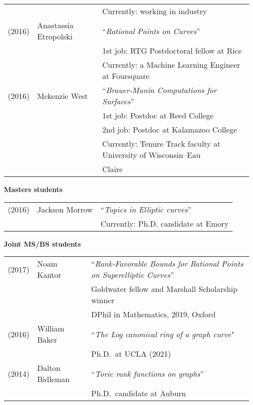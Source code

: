 \documentclass[margin,line]{res}
\newcommand{\defi}[1]{\textsf{#1}} 				%
\begin{document}
\begin{resume}
\begin{tabular}{lll}
         && \hspace{4 pt} Currently: working in industry
    \vspace{4pt}\\
  (2016) & \defi{Anastassia Etropolski} &   ``\emph{Rational Points on Curves}'' \\
         && \hspace{4 pt} 1st job: RTG Postdoctoral fellow at Rice \\
         && \hspace{4 pt} Currently: a Machine Learning Engineer at Foursquare
    \vspace{4pt}\\
  (2016) & \defi{Mckenzie West} &   ``\emph{Brauer-Manin Computations for Surfaces}'' \\
         && \hspace{4 pt} 1st job: Postdoc at Reed College\\
         &&  \hspace{4 pt} 2nd job: Postdoc at Kalamazoo College \\
         && \hspace{4 pt} Currently: Tenure Track faculty at University of Wisconsin--Eau \\
         && \hspace{4 pt}  Claire\\


\end{tabular}

{\bf Masters students}

\vspace*{-.15in}

\begin{tabular}{lll}
  (2016) &  Jackson Morrow & ``\emph{Topics in Elliptic curves}'' \\
  & & Currently: Ph.D.  candidate at Emory
\end{tabular}

  
{\bf Joint MS/BS students}
\vspace*{-.15in}

\begin{tabular}{lll}
  (2017) & \defi{Noam Kantor} & ``\emph{Rank-Favorable Bounds for Rational Points on Superelliptic Curves}'' \\
         &&   Goldwater fellow and Marshall Scholarship winner \\
  &&  DPhil in Mathematics, 2019,  Oxford \\
  (2016) & \defi{William Baker} & ``\emph{The Log canonical ring of a graph curve}" \\
&&    Ph.D.~at UCLA (2021)\\
  (2014) & \defi{Dalton Bidleman} & ``\emph{Toric rank functions on graphs}'' \\
  && Ph.D.~candidate at Auburn\\


\end{tabular}
\end{resume}
\end{document}
